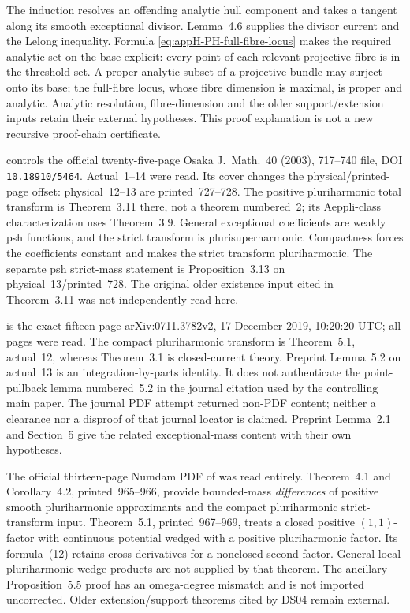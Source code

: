 The induction resolves an offending analytic hull component and takes
a tangent along its smooth exceptional divisor. Lemma~4.6 supplies
the divisor current and the Lelong inequality. Formula
\eqref{eq:appH-PH-full-fibre-locus} makes the required analytic set on
the base explicit: every point of each relevant projective fibre is
in the threshold set. A proper analytic subset of a projective bundle
may surject onto its base; the full-fibre locus, whose fibre dimension
is maximal, is proper and analytic. Analytic resolution, fibre-dimension
and the older support/extension inputs retain their external hypotheses.
This proof explanation is not a new recursive proof-chain certificate.

\cite{AlessandriniBassanelli03Transforms} controls the official
twenty-five-page Osaka J.~Math.~40 (2003), 717--740 file, DOI
\nolinkurl{10.18910/5464}. Actual~1--14 were read. Its cover changes
the physical/printed-page offset: physical~12--13 are printed~727--728.
The positive pluriharmonic total transform is Theorem~3.11 there,
not a theorem numbered~2; its Aeppli-class characterization uses
Theorem~3.9. General exceptional coefficients are weakly psh functions,
and the strict transform is plurisuperharmonic. Compactness forces
the coefficients constant and makes the strict transform pluriharmonic.
The separate psh strict-mass statement is Proposition~3.13 on
physical~13/printed~728. The original older existence input cited in
Theorem~3.11 was not independently read here.

\cite{Vigny19LelongSkodaV2} is the exact fifteen-page
arXiv:0711.3782v2, 17 December 2019, 10:20:20 UTC; all pages were
read. The compact pluriharmonic transform is Theorem~5.1, actual~12,
whereas Theorem~3.1 is closed-current theory. Preprint Lemma~5.2 on
actual~13 is an integration-by-parts identity. It does not authenticate
the point-pullback lemma numbered~5.2 in the journal citation used by
the controlling main paper. The journal PDF attempt returned non-PDF
content; neither a clearance nor a disproof of that journal locator
is claimed. Preprint Lemma~2.1 and Section~5 give the related
exceptional-mass content with their own hypotheses.

The official thirteen-page Numdam PDF of \cite{DS04} was read entirely.
Theorem~4.1 and Corollary~4.2, printed~965--966, provide bounded-mass
\emph{differences} of positive smooth pluriharmonic approximants and
the compact pluriharmonic strict-transform input. Theorem~5.1,
printed~967--969, treats a closed positive $(1,1)$-factor with continuous
potential wedged with a positive pluriharmonic factor. Its formula~(12)
retains cross derivatives for a nonclosed second factor. General local
pluriharmonic wedge products are not supplied by that theorem.
The ancillary Proposition~5.5 proof has an omega-degree mismatch and
is not imported uncorrected. Older extension/support theorems cited
by DS04 remain external.

